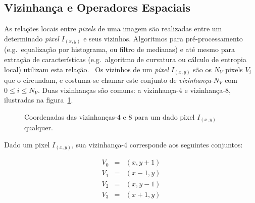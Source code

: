 \subsection{Vizinhança e Operadores Espaciais}

As relações locais entre \textit{pixels} de uma imagem são realizadas
entre um determinado \textit{pixel} $I_{(x,y)}$ e seus
vizinhos. Algoritmos para pré-processamento (e.g.\ equalização por
histograma, ou filtro de medianas) e até mesmo para extração de
características (e.g.\ algoritmo de curvatura ou cálculo de entropia
local) utilizam esta relação.~\cite{gonzalez} Os vizinhos de
um \textit{pixel} $I_{(x,y)}$ são os $N_V$ pixels $V_i$ que o
circundam, e costuma-se chamar este conjunto
de \emph{vizinhança}-$N_V$ com $0 \leq i \leq N_V$. Duas vizinhanças
são comuns: a vizinhança-4 e vizinhança-8, ilustradas na figura~\ref{fig:vizinhanca}. 

\begin{figure}[ht!]
\begin{center}
      \caption{Coordenadas das vizinhanças-$4$ e $8$ para um dado pixel
        $I_{(x,y)}$ qualquer.}
        \label{fig:vizinhanca}

\hspace{2pc}
\fonteminha
\end{center}
\end{figure}

Dado um pixel $I_{(x,y)}$,
sua vizinhança-4 corresponde aos seguintes conjuntos:

\begin{eqnarray}
  V_0 & = & (x, y+1) \\
  V_1 & = & (x-1, y) \\
  V_2 & = & (x, y-1) \\
  V_3 & = & (x+1, y)
\end{eqnarray}

